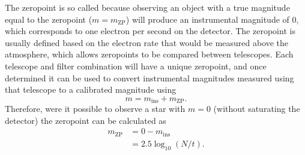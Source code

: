 \begin{colsection}
The zeropoint is so called because observing an object with a true magnitude equal to the zeropoint ($m = m_\text{ZP}$) will produce an instrumental magnitude of 0, which corresponds to one electron per second on the detector. The zeropoint is usually defined based on the electron rate that would be measured above the atmosphere, which allows zeropoints to be compared between telescopes. Each telescope and filter combination will have a unique zeropoint, and once determined it can be used to convert instrumental magnitudes measured using that telescope to a calibrated magnitude using
%
\begin{equation}
    m = m_\text{ins} + m_\text{ZP}.
    \label{eq:zp}
\end{equation}
%
Therefore, were it possible to observe a star with $m=0$ (without saturating the detector) the zeropoint can be calculated as
%
\begin{equation}
    \begin{split}
        m_\text{ZP} & = 0 - m_\text{ins} \\
                    & = 2.5 \log_{10}(N/t).
    \end{split}
    \label{eq:zp2}
\end{equation}

\newpage

\end{colsection}

